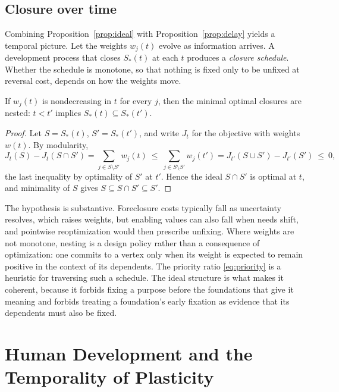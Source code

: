 \subsection{Closure over time}

Combining Proposition~\ref{prop:ideal} with Proposition~\ref{prop:delay} yields a temporal picture. Let the weights $w_j(t)$ evolve as information arrives. A development process that closes $S_\ast(t)$ at each $t$ produces a \emph{closure schedule}. Whether the schedule is monotone, so that nothing is fixed only to be unfixed at reversal cost, depends on how the weights move.

\begin{lemma}\label{lem:nested}
If $w_j(t)$ is nondecreasing in $t$ for every $j$, then the minimal optimal closures are nested: $t<t'$ implies $S_\ast(t)\subseteq S_\ast(t')$.
\end{lemma}

\begin{proof}
Let $S=S_\ast(t)$, $S'=S_\ast(t')$, and write $J_t$ for the objective with weights $w(t)$. By modularity,
\[
J_t(S)-J_t(S\cap S')=\sum_{j\in S\setminus S'}w_j(t)\ \leq\ \sum_{j\in S\setminus S'}w_j(t')=J_{t'}(S\cup S')-J_{t'}(S')\ \leq\ 0,
\]
the last inequality by optimality of $S'$ at $t'$. Hence the ideal $S\cap S'$ is optimal at $t$, and minimality of $S$ gives $S\subseteq S\cap S'\subseteq S'$.
\end{proof}

The hypothesis is substantive. Foreclosure costs typically fall as uncertainty resolves, which raises weights, but enabling values can also fall when needs shift, and pointwise reoptimization would then prescribe unfixing. Where weights are not monotone, nesting is a design policy rather than a consequence of optimization: one commits to a vertex only when its weight is expected to remain positive in the context of its dependents. The priority ratio \eqref{eq:priority} is a heuristic for traversing such a schedule. The ideal structure is what makes it coherent, because it forbids fixing a purpose before the foundations that give it meaning and forbids treating a foundation's early fixation as evidence that its dependents must also be fixed.

\section{Human Development and the Temporality of Plasticity}\label{sec:development}

